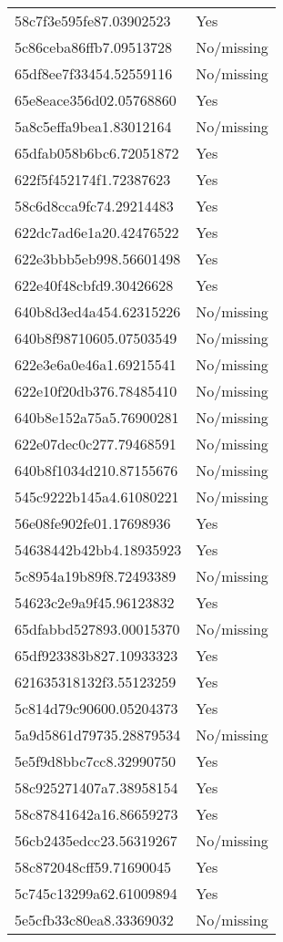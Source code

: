 \begin{tabular}{ll}
58c7f3e595fe87.03902523 & Yes \\
5c86ceba86ffb7.09513728 & No/missing \\
65df8ee7f33454.52559116 & No/missing \\
65e8eace356d02.05768860 & Yes \\
5a8c5effa9bea1.83012164 & No/missing \\
65dfab058b6bc6.72051872 & Yes \\
622f5f452174f1.72387623 & Yes \\
58c6d8cca9fc74.29214483 & Yes \\
622dc7ad6e1a20.42476522 & Yes \\
622e3bbb5eb998.56601498 & Yes \\
622e40f48cbfd9.30426628 & Yes \\
640b8d3ed4a454.62315226 & No/missing \\
640b8f98710605.07503549 & No/missing \\
622e3e6a0e46a1.69215541 & No/missing \\
622e10f20db376.78485410 & No/missing \\
640b8e152a75a5.76900281 & No/missing \\
622e07dec0c277.79468591 & No/missing \\
640b8f1034d210.87155676 & No/missing \\
545c9222b145a4.61080221 & No/missing \\
56e08fe902fe01.17698936 & Yes \\
54638442b42bb4.18935923 & Yes \\
5c8954a19b89f8.72493389 & No/missing \\
54623c2e9a9f45.96123832 & Yes \\
65dfabbd527893.00015370 & No/missing \\
65df923383b827.10933323 & Yes \\
621635318132f3.55123259 & Yes \\
5c814d79c90600.05204373 & Yes \\
5a9d5861d79735.28879534 & No/missing \\
5e5f9d8bbc7cc8.32990750 & Yes \\
58c925271407a7.38958154 & Yes \\
58c87841642a16.86659273 & Yes \\
56cb2435edcc23.56319267 & No/missing \\
58c872048cff59.71690045 & Yes \\
5c745c13299a62.61009894 & Yes \\
5e5cfb33c80ea8.33369032 & No/missing \\

\end{tabular}
